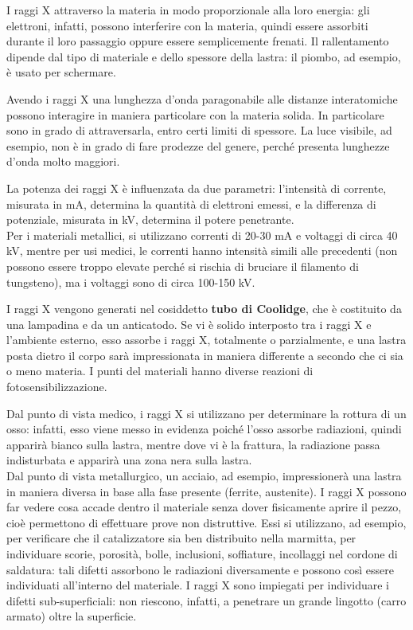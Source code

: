 I raggi X attraverso la materia in modo proporzionale alla loro energia: gli elettroni, infatti, possono interferire con la materia, quindi essere assorbiti durante il loro passaggio oppure essere semplicemente frenati. Il rallentamento dipende dal tipo di materiale e dello spessore della lastra: il piombo, ad esempio, è usato per schermare.

Avendo i raggi X una lunghezza d'onda paragonabile alle distanze interatomiche possono interagire in maniera particolare con la materia solida. In particolare sono in grado di attraversarla, entro certi limiti di spessore. La luce visibile, ad esempio, non è in grado di fare prodezze del genere, perché presenta lunghezze d'onda molto maggiori.

La potenza dei raggi X è influenzata da due parametri: l’intensità di corrente, misurata in mA, determina la quantità di elettroni emessi, e la differenza di potenziale, misurata in kV, determina il potere penetrante.\\
Per i materiali metallici, si utilizzano correnti di 20-30 mA e voltaggi di circa 40 kV, mentre per usi medici, le correnti hanno intensità simili alle precedenti (non possono essere troppo elevate perché si rischia di bruciare il filamento di tungsteno), ma i voltaggi sono di circa 100-150 kV.

I raggi X vengono generati nel cosiddetto \textbf{tubo di Coolidge}, che è costituito da una lampadina e da un anticatodo. Se vi è solido interposto tra i raggi X e l’ambiente esterno, esso assorbe i raggi X, totalmente o parzialmente, e una lastra posta dietro il corpo sarà impressionata in maniera differente a secondo che ci sia o meno materia. I punti del materiali hanno diverse reazioni di fotosensibilizzazione.

Dal punto di vista medico, i raggi X si utilizzano per determinare la rottura di un osso: infatti, esso viene messo in evidenza poiché l’osso assorbe radiazioni, quindi apparirà bianco sulla lastra, mentre dove vi è la frattura, la radiazione passa indisturbata e apparirà una zona nera sulla lastra.\\
Dal punto di vista metallurgico, un acciaio, ad esempio, impressionerà una lastra in maniera diversa in base alla fase presente (ferrite, austenite).
I raggi X possono far vedere cosa accade dentro il materiale senza dover fisicamente aprire il pezzo, cioè permettono di effettuare prove non distruttive. Essi si utilizzano, ad esempio, per verificare che il catalizzatore sia ben distribuito nella marmitta, per individuare scorie, porosità, bolle, inclusioni, soffiature, incollaggi nel cordone di saldatura: tali difetti assorbono le radiazioni diversamente e possono così essere individuati all’interno del materiale.
I raggi X sono impiegati per individuare i difetti sub-superficiali: non riescono, infatti, a penetrare un grande lingotto (carro armato) oltre la superficie.

